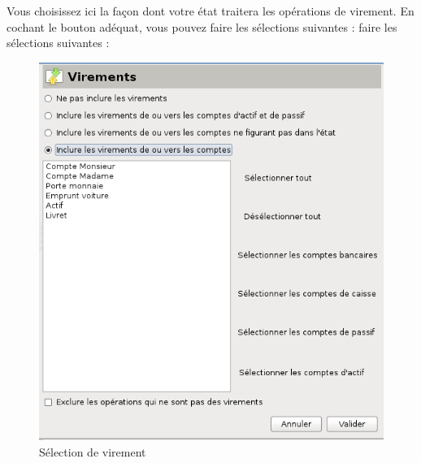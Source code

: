 Vous choisissez ici la façon dont votre état traitera les opérations de virement. En cochant le bouton adéquat, vous pouvez \ifIllustration faire les sélections suivantes :
\else faire les sélections suivantes :
\fi

\ifIllustration
\begin{figure}[htbp]
\begin{center}
\includegraphics[scale=0.5]{image/screenshot/reportcreation_datas_transfers}
\end{center}
\caption{Sélection de virement}
\label{reportcreation-datas-transfers-img}
\end{figure}
\fi

